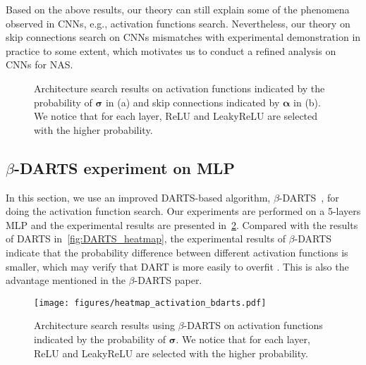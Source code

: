 \documentclass[nohyperref]{article}
\theoremstyle{plain}
\theoremstyle{definition}
\theoremstyle{remark}
\begin{document}
Based on the above results, our theory can still explain some of the phenomena observed in CNNs, e.g., activation functions search.
Nevertheless, our theory on skip connections search on CNNs mismatches with experimental demonstration in practice to some extent, which motivates us to conduct a refined analysis on CNNs for NAS.   

\begin{figure}[t]
\centering
\caption{Architecture search results on activation functions indicated by the probability of $\bm \sigma$ in (a) and skip connections indicated by $\bm \alpha$ in (b). We notice that for each layer, ReLU and LeakyReLU are selected with the higher probability.}
\label{fig:DARTS_heatmap_cnn}
\end{figure}


\subsection{$\beta$-DARTS experiment on MLP}
\label{ssec:B_DARTS_experiment}

In this section, we use an improved DARTS-based algorithm, $\beta$-DARTS~\citep{https://doi.org/10.48550/arxiv.2203.01665}, for doing the activation function search. Our experiments are performed on a 5-layers MLP and the experimental results are presented in~\cref{fig:B_DARTS_experiment}. Compared with the results of DARTS in~\cref{fig:DARTS_heatmap}, the experimental results of $\beta$-DARTS indicate that the probability difference between different activation functions is smaller, which may verify that DART is more easily to overfit . This is also the advantage mentioned in the $\beta$-DARTS paper.


\begin{figure}[t]
\centering
    \texttt{[image: figures/heatmap\_activation\_bdarts.pdf]}\vspace{-5mm}
\caption{Architecture search results using $\beta$-DARTS on activation functions indicated by the probability of $\bm \sigma$. We notice that for each layer, ReLU and LeakyReLU are selected with the higher probability.}
\label{fig:B_DARTS_experiment}
\end{figure}
\end{document}

